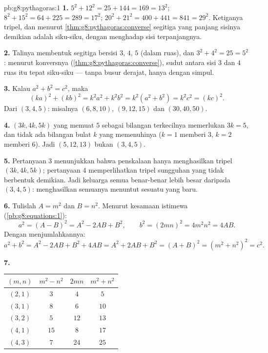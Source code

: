 \begin{solution}{pb:g8:pythagoras:1}
\textbf{1.} $5^2 + 12^2 = 25 + 144 = 169 = 13^2$; \quad
$8^2 + 15^2 = 64 + 225 = 289 = 17^2$; \quad
$20^2 + 21^2 = 400 + 441 = 841 = 29^2$. Ketiganya tripel, dan menurut
\cref{thm:g8:pythagoras:converse} segitiga yang panjang sisinya
demikian adalah siku-siku, dengan  menghadap sisi
terpanjangnya.

\textbf{2.} Talinya membentuk segitiga bersisi $3$, $4$, $5$
(dalam ruas), dan $3^2 + 4^2 = 25 = 5^2$: menurut konversnya
(\cref{thm:g8:pythagoras:converse}), sudut antara sisi
$3$ dan $4$ ruas itu tepat siku-siku --- tanpa busur derajat,
hanya dengan simpul.

\textbf{3.} Kalau $a^2 + b^2 = c^2$, maka
\[
(ka)^2 + (kb)^2 = k^2 a^2 + k^2 b^2
= k^2\left(a^2 + b^2\right) = k^2 c^2 = (kc)^2 .
\]
Dari $(3, 4, 5)$: misalnya $(6, 8, 10)$, $(9, 12, 15)$ dan
$(30, 40, 50)$.

\textbf{4.}  $(3k, 4k, 5k)$ yang memuat $5$ sebagai bilangan
terkecilnya memerlukan $3k = 5$, dan tidak ada bilangan bulat $k$
yang memenuhinya ($k = 1$ memberi $3$, $k = 2$ memberi $6$). Jadi
$(5, 12, 13)$ bukan  $(3, 4, 5)$.

\textbf{5.} Pertanyaan 3 menunjukkan bahwa penskalaan hanya
menghasilkan tripel $(3k, 4k, 5k)$; pertanyaan 4 memperlihatkan tripel
sungguhan yang tidak berbentuk demikian. Jadi keluarga semua  benar-benar lebih besar daripada  $(3, 4, 5)$:
menghasilkan semuanya menuntut sesuatu yang baru.

\textbf{6.} Tulislah $A = m^2$ dan $B = n^2$. Menurut kesamaan
istimewa (\cref{pb:g8:equations:1}):
\[
a^2 = (A - B)^2 = A^2 - 2AB + B^2,
\qquad
b^2 = (2mn)^2 = 4m^2n^2 = 4AB .
\]
Dengan menjumlahkannya:
\[
a^2 + b^2 = A^2 - 2AB + B^2 + 4AB
= A^2 + 2AB + B^2 = (A + B)^2
= \left(m^2 + n^2\right)^2 = c^2 .
\]

\textbf{7.}
\begin{center}
\renewcommand{\arraystretch}{1.2}
\begin{tabular}{c|ccc}
$(m, n)$ & $m^2 - n^2$ & $2mn$ & $m^2 + n^2$ \\
\hline
$(2, 1)$ & $3$ & $4$ & $5$ \\
$(3, 1)$ & $8$ & $6$ & $10$ \\
$(3, 2)$ & $5$ & $12$ & $13$ \\
$(4, 1)$ & $15$ & $8$ & $17$ \\
$(4, 3)$ & $7$ & $24$ & $25$ \\
\end{tabular}
\end{center}


\end{solution}
